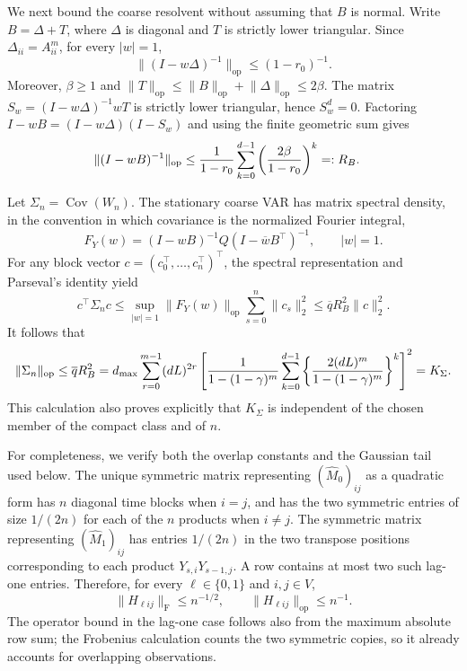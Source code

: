 We next bound the coarse resolvent without assuming that \(B\) is normal.
Write \(B=\Delta+T\), where \(\Delta\) is diagonal and \(T\) is strictly
lower triangular. Since \(\Delta_{ii}=A_{ii}^m\), for every \(|w|=1\),
\[
 \lVert(I-w\Delta)^{-1}\rVert_{\mathrm{op}}
 \le(1-r_0)^{-1}.
\]
Moreover, \(\beta\ge1\) and
\(\lVert T\rVert_{\mathrm{op}}\le\lVert B\rVert_{\mathrm{op}}+
\lVert\Delta\rVert_{\mathrm{op}}\le2\beta\). The matrix
\(S_w=(I-w\Delta)^{-1}wT\) is strictly lower triangular, hence
\(S_w^d=0\). Factoring \(I-wB=(I-w\Delta)(I-S_w)\) and using the finite
geometric sum gives
\[
 \begin{split}
 \lVert(I-wB)^{-1}\rVert_{\mathrm{op}}
 &\le {1\over1-r_0}\sum_{k=0}^{d-1}
 \left({2\beta\over1-r_0}\right)^k
 =:R_B.
 \end{split}
\]

Let \(\Sigma_n=\operatorname{Cov}(W_n)\). The stationary coarse VAR has
matrix spectral density, in the convention in which covariance is the
normalized Fourier integral,
\[
 F_Y(w)=(I-wB)^{-1}Q(I-\overline w B^\top)^{-1},
 \qquad |w|=1.
\]
For any block vector \(c=(c_0^\top,\ldots,c_n^\top)^\top\), the spectral
representation and Parseval's identity yield
\[
 c^\top\Sigma_nc
 \le \sup_{|w|=1}\lVert F_Y(w)\rVert_{\mathrm{op}}
       \sum_{s=0}^n\lVert c_s\rVert_2^2
 \le \overline q R_B^2\lVert c\rVert_2^2.
\]
It follows that
\[
 \lVert\Sigma_n\rVert_{\mathrm{op}}\le \overline q R_B^2
 =d_{\max}\sum_{r=0}^{m-1}(dL)^{2r}
 \left[
 {1\over1-(1-\gamma)^m}
 \sum_{k=0}^{d-1}
 \left\{{2(dL)^m\over1-(1-\gamma)^m}\right\}^{k}
 \right]^2
 =K_\Sigma.
\]
This calculation also proves explicitly that \(K_\Sigma\) is independent of
the chosen member of the compact class and of \(n\).

For completeness, we verify both the overlap constants and the Gaussian
tail used below. The unique symmetric matrix representing
\((\widehat M_0)_{ij}\) as a quadratic form has \(n\) diagonal time blocks
when \(i=j\), and has the two symmetric entries of size \(1/(2n)\) for each
of the \(n\) products when \(i\ne j\). The symmetric matrix representing
\((\widehat M_1)_{ij}\) has entries \(1/(2n)\) in the two transpose
positions corresponding to each product
\(Y_{s,i}Y_{s-1,j}\). A row contains at most two such lag-one entries.
Therefore, for every \(\ell\in\{0,1\}\) and \(i,j\in V\),
\[
 \lVert H_{\ell ij}\rVert_{\mathrm F}\le n^{-1/2},
 \qquad
 \lVert H_{\ell ij}\rVert_{\mathrm{op}}\le n^{-1}.
\]
The operator bound in the lag-one case follows also from the maximum
absolute row sum; the Frobenius calculation counts the two symmetric
copies, so it already accounts for overlapping observations.

